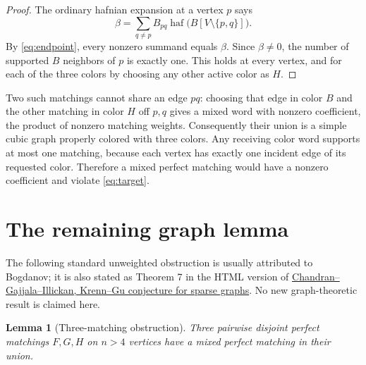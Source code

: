 \documentclass[11pt]{article}
\newtheorem{lemma}[theorem]{Lemma}
\numberwithin{equation}{section}
\begin{document}
\begin{proof}
The ordinary hafnian expansion at a vertex \(p\) says
\[
 \beta=\sum_{q\ne p}B_{pq}\operatorname{haf}\bigl(B[V\setminus\{p,q\}]\bigr).
\]
By \eqref{eq:endpoint}, every nonzero summand equals \(\beta\). Since
\(\beta\ne0\), the number of supported \(B\) neighbors of \(p\) is exactly
one. This holds at every vertex, and for each of the three colors by choosing
any other active color as \(H\).
\end{proof}

Two such matchings cannot share an edge \(pq\): choosing that edge in color
\(B\) and the other matching in color \(H\) off \(p,q\) gives a mixed word
with nonzero coefficient, the product of nonzero matching weights.
Consequently their union is a simple cubic graph properly colored with three
colors. Any receiving color word supports at most one matching, because each
vertex has exactly one incident edge of its requested color. Therefore a
mixed perfect matching would have a nonzero coefficient and violate
\eqref{eq:target}.

\section{The remaining graph lemma}\label{sec:graph}

The following standard unweighted obstruction is usually attributed to
Bogdanov; it is also stated as Theorem 7 in the HTML version of
\href{https://arxiv.org/html/2407.00303}{Chandran--Gajjala--Illickan, Krenn--Gu conjecture for sparse graphs}.
No new graph-theoretic result is claimed here.

\begin{lemma}[Three-matching obstruction]\label{lem:graph}
Three pairwise disjoint perfect matchings \(F,G,H\) on \(n>4\) vertices
have a mixed perfect matching in their union.
\end{lemma}
\end{document}
